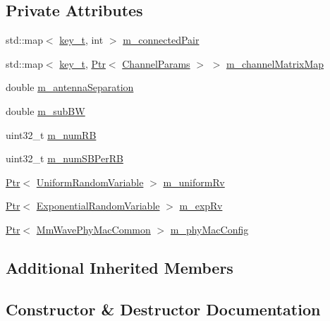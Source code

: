 \subsection*{Private Attributes}
\begin{DoxyCompactItemize}
\item 
std\+::map$<$ \hyperlink{namespacens3_aa42bd408e172586b3b192acfaa36b070}{key\+\_\+t}, int $>$ \hyperlink{classns3_1_1MmWaveChannelMatrix_a6c0f656e01119626c1f3887f0ba295e0}{m\+\_\+connected\+Pair}
\item 
std\+::map$<$ \hyperlink{namespacens3_aa42bd408e172586b3b192acfaa36b070}{key\+\_\+t}, \hyperlink{classns3_1_1Ptr}{Ptr}$<$ \hyperlink{structns3_1_1ChannelParams}{Channel\+Params} $>$ $>$ \hyperlink{classns3_1_1MmWaveChannelMatrix_ad505ccb88c10f493fbba01d12732241f}{m\+\_\+channel\+Matrix\+Map}
\item 
double \hyperlink{classns3_1_1MmWaveChannelMatrix_a91d12a913567e33fc21fbc6275414008}{m\+\_\+antenna\+Separation}
\item 
double \hyperlink{classns3_1_1MmWaveChannelMatrix_a0111a9ed650a9e570974268aac7b2ef7}{m\+\_\+sub\+BW}
\item 
uint32\+\_\+t \hyperlink{classns3_1_1MmWaveChannelMatrix_a8ea4baeefad7cce0f0c702e93fd32d2b}{m\+\_\+num\+RB}
\item 
uint32\+\_\+t \hyperlink{classns3_1_1MmWaveChannelMatrix_ad0bcea397bcd1f0a8f8487eadcab39b0}{m\+\_\+num\+S\+B\+Per\+RB}
\item 
\hyperlink{classns3_1_1Ptr}{Ptr}$<$ \hyperlink{classns3_1_1UniformRandomVariable}{Uniform\+Random\+Variable} $>$ \hyperlink{classns3_1_1MmWaveChannelMatrix_a914afe40a958ddccd64a99f86190be0c}{m\+\_\+uniform\+Rv}
\item 
\hyperlink{classns3_1_1Ptr}{Ptr}$<$ \hyperlink{classns3_1_1ExponentialRandomVariable}{Exponential\+Random\+Variable} $>$ \hyperlink{classns3_1_1MmWaveChannelMatrix_a7fee3ea2f2e3812df87e63e3baa743d0}{m\+\_\+exp\+Rv}
\item 
\hyperlink{classns3_1_1Ptr}{Ptr}$<$ \hyperlink{classns3_1_1MmWavePhyMacCommon}{Mm\+Wave\+Phy\+Mac\+Common} $>$ \hyperlink{classns3_1_1MmWaveChannelMatrix_ad92dc270601be7284b3e8b42654307fa}{m\+\_\+phy\+Mac\+Config}
\end{DoxyCompactItemize}
\subsection*{Additional Inherited Members}


\subsection{Constructor \& Destructor Documentation}
